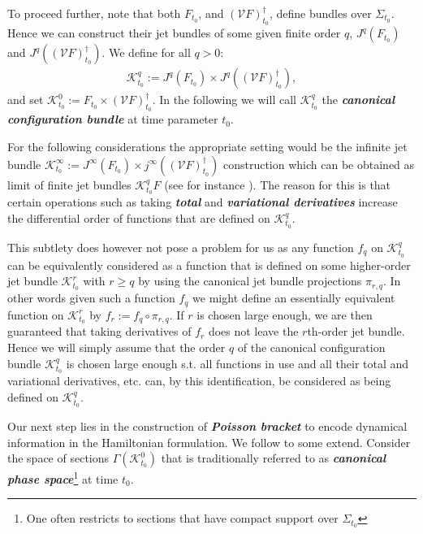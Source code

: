 To proceed further, note that both $F_{t_0}$, and $(\mathcal{V}F)_{t_0}^{\dagger}$, define bundles over $\Sigma_{t_0}$. Hence we can construct their jet bundles of some given finite order $q$, $J^q(F_{t_0})$ and $J^q((\mathcal{V}F)_{t_0}^{\dagger})$. 
We define for all $q>0$:
\begin{align} 
\mathcal{K}^q_{t_0} := J^q(F_{t_0})\times J^q((\mathcal{V}F)_{t_0}^{\dagger}),
\end{align}
and set $\mathcal{K}^0_{t_0} := F_{t_0}\times (\mathcal{V}F)_{t_0}^{\dagger}$.
In the following we will call $\mathcal{K}^q_{t_0}$ the \textit{\textbf{canonical configuration bundle}} at time parameter $t_0$. 

\begin{remark}
For the following considerations the appropriate setting would be the infinite jet bundle $\mathcal{K}^{\infty}_{t_0} := J^{\infty}(F_{t_0})\times j^{\infty}((\mathcal{V}F)_{t_0}^{\dagger})$ construction which can be obtained as limit of finite jet bundles $\mathcal{K}^q_{t_0}F$ (see for instance \cite{saunders_1989}). The reason for this is that certain operations such as taking \textit{\textbf{total}} and \textit{\textbf{variational derivatives}} increase the differential order of functions that are defined on $\mathcal{K}^{q}_{t_0}$.

This subtlety does however not pose a problem for us as any function $f_q$ on $\mathcal{K}^q_{t_0}$ can be equivalently considered as a function that is defined on some higher-order jet bundle $\mathcal{K}^r_{t_0}$ with $r\geq q$ by using the canonical jet bundle projections $\pi_{r,q}$. In other words given such a function $f_q$ we might define an essentially equivalent function on $\mathcal{K}^r_{t_0}$ by $f_r:=f_q \circ \pi_{r,q}$. If $r$ is chosen large enough, we are then guaranteed that taking derivatives of $f_r$ does not leave the $r$th-order jet bundle. Hence we will simply assume that the order $q$ of the canonical configuration bundle $\mathcal{K}^q_{t_0}$ is chosen large enough s.t. all functions in use and all their total and variational derivatives, etc. can, by this identification, be considered as being defined on $\mathcal{K}^q_{t_0}$. 
\end{remark}

Our next step lies in the construction of \textit{\textbf{Poisson bracket}} to encode dynamical information in the Hamiltonian formulation. 
We follow \cite{1997hep.th....9164B} to some extend. Consider the space of sections  $\Gamma(\mathcal{K}^0_{t_0})$ that is traditionally referred to as \textit{\textbf{canonical phase space}}\footnote{One often restricts to sections that have compact support over $\Sigma_{t_0}$} at time $t_0$. 

